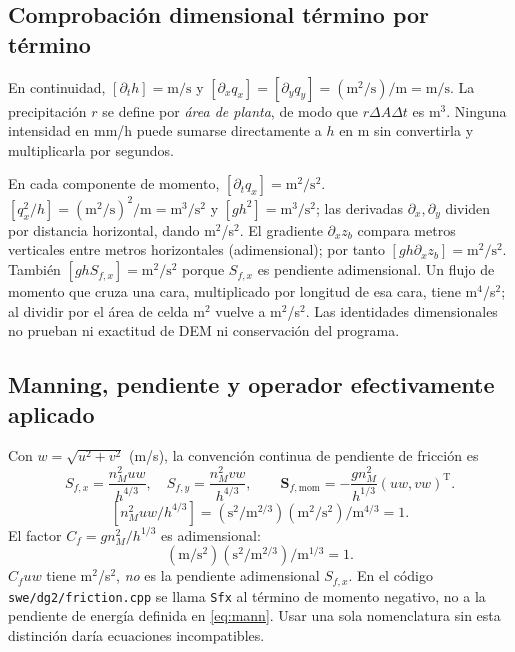 \documentclass[11pt,a4paper]{article}
\newcommand{\src}[1]{\nolinkurl{#1}}
\newcommand{\unit}[1]{\mathrm{#1}}
\begin{document}
\subsection{Comprobación dimensional término por término}
En continuidad, $[\partial_t h]=\unit{m/s}$ y $[\partial_xq_x]=[\partial_yq_y]=(\unit{m^2/s})/\unit m=\unit{m/s}$. La precipitación $r$ se define por \emph{área de planta}, de modo que $r\Delta A\Delta t$ es m$^3$. Ninguna intensidad en mm/h puede sumarse directamente a $h$ en m sin convertirla y multiplicarla por segundos.

En cada componente de momento, $[\partial_t q_x]=\unit{m^2/s^2}$. $[q_x^2/h]=(\unit{m^2/s})^2/\unit m=\unit{m^3/s^2}$ y $[gh^2]=\unit{m^3/s^2}$; las derivadas $\partial_x,\partial_y$ dividen por distancia horizontal, dando m$^2$/s$^2$. El gradiente $\partial_xz_b$ compara metros verticales entre metros horizontales (adimensional); por tanto $[gh\partial_xz_b]=\unit{m^2/s^2}$. También $[gh S_{f,x}]=\unit{m^2/s^2}$ porque $S_{f,x}$ es pendiente adimensional. Un flujo de momento que cruza una cara, multiplicado por longitud de esa cara, tiene m$^4$/s$^2$; al dividir por el área de celda m$^2$ vuelve a m$^2$/s$^2$. Las identidades dimensionales no prueban ni exactitud de DEM ni conservación del programa.

\subsection{Manning, pendiente y operador efectivamente aplicado}
Con $w=\sqrt{u^2+v^2}$ (m/s), la convención continua de pendiente de fricción es
\begin{equation}
 S_{f,x}=\frac{n_M^2uw}{h^{4/3}},\quad S_{f,y}=\frac{n_M^2vw}{h^{4/3}},\qquad
 \boldsymbol S_{f,\mathrm{mom}}=-\frac{g n_M^2}{h^{1/3}}(uw,vw)^{\mathrm T}.\label{eq:mann}
\end{equation}
\[
[n_M^2uw/h^{4/3}]=(\unit{s^2/m^{2/3}})(\unit{m^2/s^2})/\unit{m^{4/3}}=1.
\] El factor $C_f=gn_M^2/h^{1/3}$ es adimensional: \[
(\unit{m/s^2})(\unit{s^2/m^{2/3}})/\unit{m^{1/3}}=1.
\] $C_fuw$ tiene m$^2$/s$^2$, \emph{no} es la pendiente adimensional $S_{f,x}$. En el código \src{swe/dg2/friction.cpp} se llama \texttt{Sfx} al término de momento negativo, no a la pendiente de energía definida en \eqref{eq:mann}. Usar una sola nomenclatura sin esta distinción daría ecuaciones incompatibles.
\end{document}
